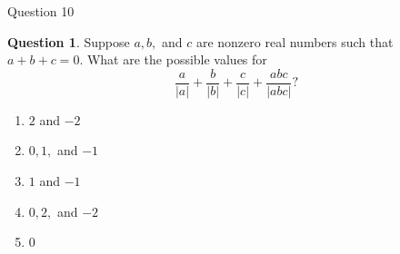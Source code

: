 \documentclass[handout]{beamer}
\theoremstyle{definition}
\newtheorem{quest}{Question}
\begin{document}
\begin{frame}{Question 10}
\begin{quest}
Suppose $a,b,$ and $c$ are nonzero real numbers such that $a+b+c=0$.
What are the possible values for
$$\frac{a}{|a|} + \frac{b}{|b|} + \frac{c}{|c|} + \frac{abc}{|abc|}?$$
\begin{enumerate}[a]
\item $2$ and $-2$
\item $0,1,$ and $-1$
\item $1$ and $-1$
\item $0,2,$ and $-2$
\item $0$
\end{enumerate}
\end{quest}

\end{frame}
\end{document}
